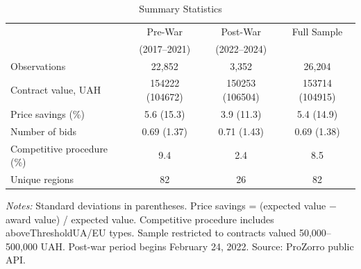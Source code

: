 \begin{table}[htbp]
\centering
\caption{Summary Statistics}
\label{tab:summ}
\begin{tabular}{lccc}
\toprule
 & Pre-War & Post-War & Full Sample \\
 & (2017--2021) & (2022--2024) & \\
\midrule
Observations & 22,852 & 3,352 & 26,204 \\
Contract value, UAH & 154222 (104672) & 150253 (106504) & 153714 (104915) \\
Price savings (\%) & 5.6 (15.3) & 3.9 (11.3) & 5.4 (14.9) \\
Number of bids & 0.69 (1.37) & 0.71 (1.43) & 0.69 (1.38) \\
Competitive procedure (\%) & 9.4 & 2.4 & 8.5 \\
Unique regions & 82 & 26 & 82 \\
\bottomrule
\end{tabular}
\begin{tablenotes}[flushleft]
\small
\item \textit{Notes:} Standard deviations in parentheses. Price savings = (expected value $-$ award value) / expected value. Competitive procedure includes aboveThresholdUA/EU types. Sample restricted to contracts valued 50,000--500,000 UAH. Post-war period begins February 24, 2022. Source: ProZorro public API.
\end{tablenotes}
\end{table}
